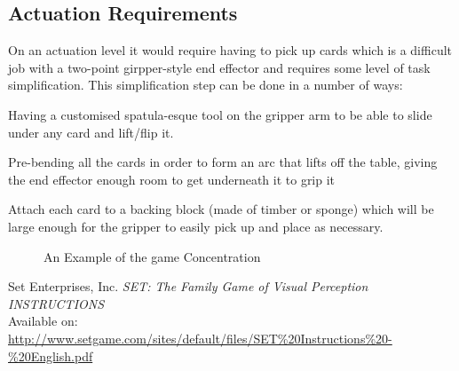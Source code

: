 \documentclass[dvips,12pt]{article}
\begin{document}
	\subsection{Actuation Requirements}
		On an actuation level it would require having to pick up cards which is a difficult job with a two-point girpper-style end effector and requires some level of task simplification. This simplification step can be done in a number of ways:
		\begin{list}{:~}{}
			\item Having a customised spatula-esque tool on the gripper arm to be able to slide under any card and lift/flip it.
			\item Pre-bending all the cards in order to form an arc that lifts off the table, giving the end effector enough room to get underneath it to grip it
			\item Attach each card to a backing block (made of timber or sponge) which will be large enough for the gripper to easily pick up and place as necessary.
		\end{list}
		

		\begin{figure}[position = here]
			\begin{center}
				\caption{An Example of the game Concentration\label{pic1}}
			\end{center}
		\end{figure}
		
		\newpage
		\begin{thebibliography}{99}
			
			 Set Enterprises, Inc. \emph{SET: The Family Game of Visual Perception INSTRUCTIONS}\\
			Available on:\\ \url{http://www.setgame.com/sites/default/files/SET%20Instructions%20-%20English.pdf}	
			
		\end{thebibliography}
		
\end{document}
